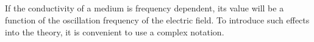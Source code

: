 %
%
%
%
%

\subsection{}
\label{sec:Sigma:Complex}

If the conductivity of a medium is frequency dependent, its value will be a function of the
oscillation frequency of the electric field. 
To introduce such effects into the theory, it is convenient to use a complex notation. 

